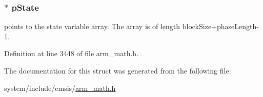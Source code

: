 \subsubsection[{\texorpdfstring{p\+State}{pState}}]{$\ast$ p\+State}\hypertarget{structarm__fir__interpolate__instance__q31_adee4ba3ee8869865af7d8fa08ca913d6}{}\label{structarm__fir__interpolate__instance__q31_adee4ba3ee8869865af7d8fa08ca913d6}
points to the state variable array. The array is of length block\+Size+phase\+Length-\/1. 

Definition at line 3448 of file arm\+\_\+math.\+h.



The documentation for this struct was generated from the following file\+:\begin{DoxyCompactItemize}
\item 
system/include/cmsis/\hyperlink{arm__math_8h}{arm\+\_\+math.\+h}\end{DoxyCompactItemize}
